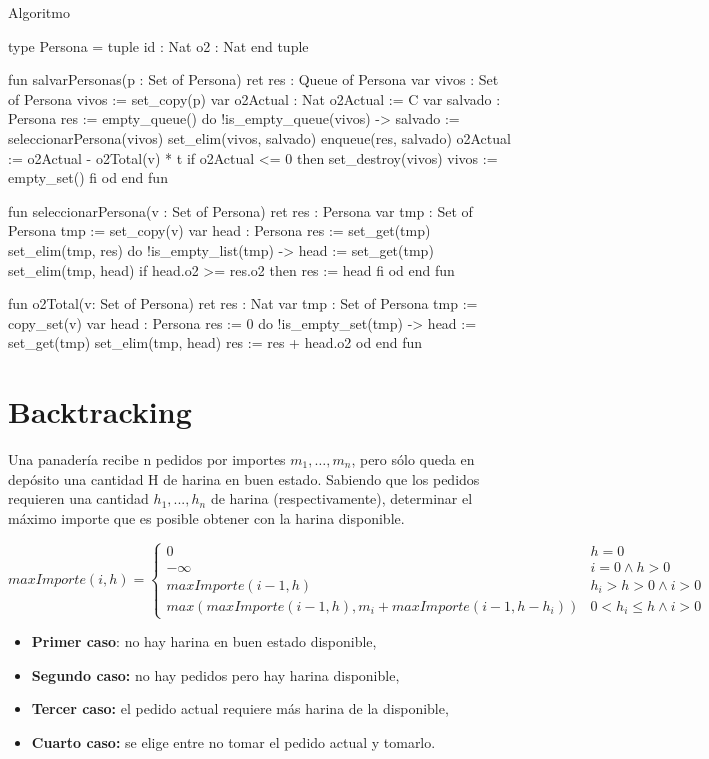 \begin{codebox}{Algoritmo}
\begin{pascallike}
type Persona = tuple
                   id : Nat
                   o2 : Nat
                end tuple

fun salvarPersonas(p : Set of Persona) ret res : Queue of Persona
    var vivos : Set of Persona
    vivos := set_copy(p)
    var o2Actual : Nat
    o2Actual := C
    var salvado : Persona
    res := empty_queue()
    do !is_empty_queue(vivos) ->
        salvado := seleccionarPersona(vivos)
        set_elim(vivos, salvado)
        enqueue(res, salvado)
        o2Actual := o2Actual - o2Total(v) * t
        if o2Actual <= 0 then
            set_destroy(vivos)
            vivos := empty_set()
        fi 
    od
end fun

fun seleccionarPersona(v : Set of Persona) ret res : Persona
    var tmp : Set of Persona
    tmp := set_copy(v)
    var head : Persona
    res := set_get(tmp)
    set_elim(tmp, res)
    do !is_empty_list(tmp) ->
        head := set_get(tmp)
        set_elim(tmp, head)
        if head.o2 >= res.o2 then
            res := head
        fi
    od
end fun

fun o2Total(v: Set of Persona) ret res : Nat
    var tmp : Set of Persona
    tmp := copy_set(v)
    var head : Persona
    res := 0
    do !is_empty_set(tmp) ->
        head := set_get(tmp)
        set_elim(tmp, head)
        res := res + head.o2
    od
end fun
\end{pascallike}
\end{codebox}

\section{Backtracking}

Una panadería recibe n pedidos por importes $m_1, \dots , m_n$, pero sólo queda en depósito una cantidad H de harina en buen estado. Sabiendo que los pedidos requieren una cantidad $h_1, . . . , h_n$ de harina (respectivamente), determinar el máximo importe que es posible obtener con la harina disponible.

$$
maxImporte(i, h) =
\begin{cases}
0 & h = 0 \\
-\infty & i = 0 \wedge h > 0 \\
maxImporte(i-1, h) & h_i >h>0 \wedge i>0 \\
max(maxImporte(i-1, h), m_i + maxImporte(i-1,h-h_i)) & 0 < h_i \leq h \wedge i > 0 
\end{cases}
$$
\begin{itemize}
    \item \textbf{Primer caso}: no hay harina en buen estado disponible,
    \item \textbf{Segundo caso:} no hay pedidos pero hay harina disponible,
    \item \textbf{Tercer caso:} el pedido actual requiere más harina de la disponible,
    \item \textbf{Cuarto caso:} se elige entre no tomar el pedido actual y tomarlo.
\end{itemize}

